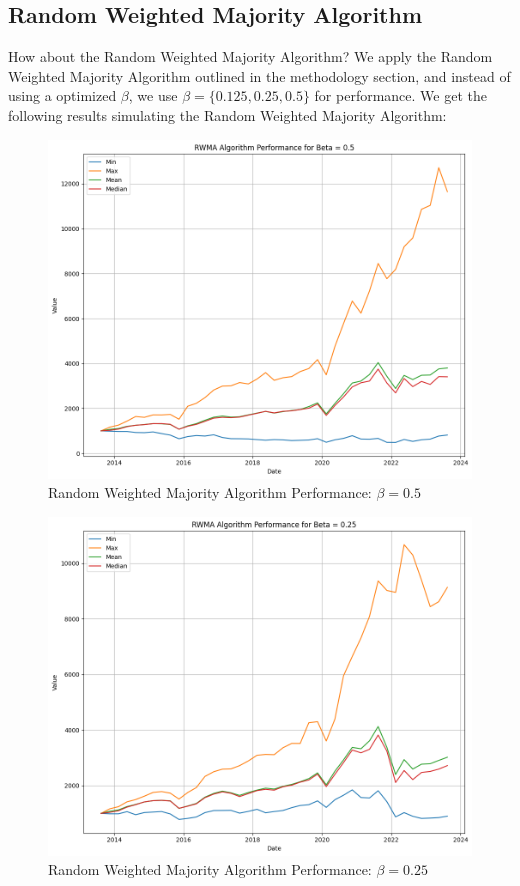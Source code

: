 \documentclass{article}
\begin{document}
\subsection{Random Weighted Majority Algorithm}
\label{subsec:random-weighted-majority}
How about the Random Weighted Majority Algorithm? We apply the Random Weighted Majority Algorithm outlined in the methodology section, and instead of using a optimized $\beta$, we use $\beta=\{0.125, 0.25, 0.5\}$ for performance. We get the following results simulating the Random Weighted Majority Algorithm:
\begin{figure}[H]
    \centering
    \includegraphics[width=1\textwidth]{rwma_0.5.png}
    \caption{Random Weighted Majority Algorithm Performance: $\beta=0.5$}
    \label{fig:rwma_0.5}
\end{figure}
\begin{figure}[H]
    \centering
    \includegraphics[width=1\textwidth]{rwma_0.25.png}
    \caption{Random Weighted Majority Algorithm Performance: $\beta=0.25$}
    \label{fig:rwma_0.25}
\end{figure}
\end{document}
